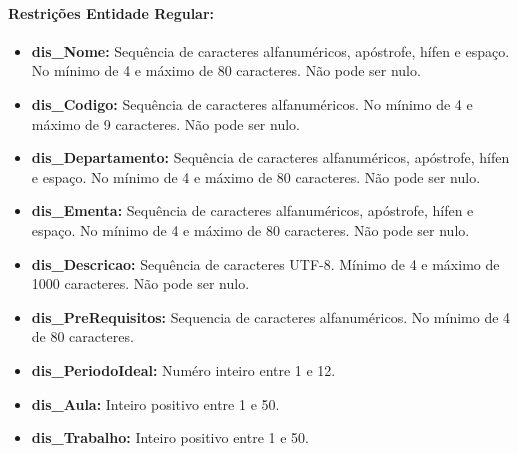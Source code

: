 \documentclass{report}
\begin{document}
\paragraph{Restrições Entidade Regular:}
\begin{itemize}
  \item \textbf{dis\_Nome:} Sequência de caracteres alfanuméricos, apóstrofe, hífen e espaço. No mínimo de 4 e máximo de 80 caracteres. Não pode ser nulo.
  \item \textbf{dis\_Codigo:}  Sequência de caracteres alfanuméricos. No mínimo de 4 e máximo de 9 caracteres. Não pode ser nulo.
  \item \textbf{dis\_Departamento:} Sequência de caracteres alfanuméricos, apóstrofe, hífen e espaço. No mínimo de 4 e máximo de 80 caracteres. Não pode ser nulo.
  \item \textbf{dis\_Ementa:} Sequência de caracteres alfanuméricos, apóstrofe, hífen e espaço. No mínimo de 4 e máximo de 80 caracteres. Não pode ser nulo.
  \item \textbf{dis\_Descricao:} Sequência de caracteres UTF-8. Mínimo de 4 e máximo de 1000 caracteres. Não pode ser nulo.
  \item \textbf{dis\_PreRequisitos:} Sequencia de caracteres alfanuméricos. No mínimo de 4 de 80 caracteres. 
  \item \textbf{dis\_PeriodoIdeal:}  Numéro inteiro entre 1 e 12.
  \item \textbf{dis\_Aula:} Inteiro positivo entre 1 e 50.
  \item \textbf{dis\_Trabalho:} Inteiro positivo entre 1 e 50.
\end{itemize}
\end{document}
